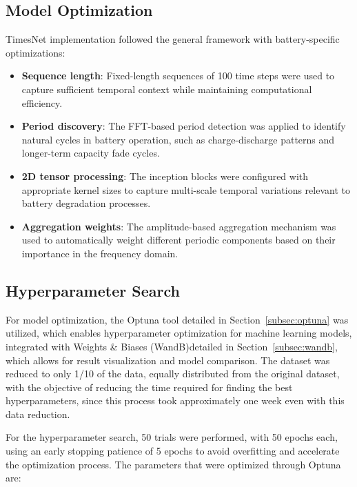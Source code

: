 \subsection{Model Optimization}
\label{sec:model_optimization}

TimesNet implementation followed the general framework with battery-specific optimizations:

\begin{itemize}
    \item \textbf{Sequence length}: Fixed-length sequences of 100 time steps were used to capture sufficient temporal context while maintaining computational efficiency.
    \item \textbf{Period discovery}: The FFT-based period detection was applied to identify natural cycles in battery operation, such as charge-discharge patterns and longer-term capacity fade cycles.
    \item \textbf{2D tensor processing}: The inception blocks were configured with appropriate kernel sizes to capture multi-scale temporal variations relevant to battery degradation processes.
    \item \textbf{Aggregation weights}: The amplitude-based aggregation mechanism was used to automatically weight different periodic components based on their importance in the frequency domain.
\end{itemize}

\subsection{Hyperparameter Search}

For model optimization, the Optuna tool detailed in Section~\ref{subsec:optuna} was utilized, which enables hyperparameter optimization for machine learning models, integrated with Weights \& Biases (WandB)detailed in Section~\ref{subsec:wandb}, which allows for result visualization and model comparison. The dataset was reduced to only 1/10 of the data, equally distributed from the original dataset, with the objective of reducing the time required for finding the best hyperparameters, since this process took approximately one week even with this data reduction.

For the hyperparameter search, 50 trials were performed, with 50 epochs each, using an early stopping patience of 5 epochs to avoid overfitting and accelerate the optimization process. The parameters that were optimized through Optuna are:

